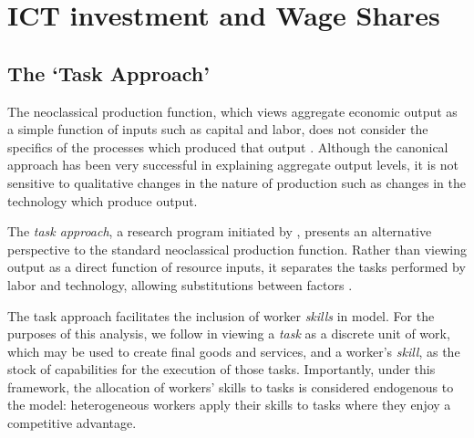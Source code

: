 \chapter{ICT investment and Wage Shares}\label{ch:3}




\section{The `Task Approach'}

The neoclassical production function, which views aggregate economic output as a simple function of inputs such as capital and labor, does not consider the specifics of the processes which produced that output \citep{Acemoglu2011}. Although the canonical approach has been very successful in explaining aggregate output levels, it is not sensitive to qualitative changes in the nature of production such as changes in the technology which produce output. 

The {\em task approach}, a research program initiated by \citet{Levy2003}, presents an alternative perspective to the standard neoclassical production function. Rather than viewing output as a direct function of resource inputs, it separates the tasks performed by labor and technology, allowing  substitutions between factors \citep{Autor2013,Acemoglu2011}. 

The task approach facilitates the inclusion of worker \emph{skills} in model. For the purposes of this analysis, we follow \citet{Autor2013} in viewing a \emph{task} as a discrete unit of work, which may be used to create final goods and services, and a worker's \emph{skill}, as the stock of capabilities for the execution of those tasks. Importantly, under this framework, the allocation of workers' skills to tasks is considered endogenous to the model: heterogeneous workers apply their skills to tasks where they enjoy a competitive advantage.

